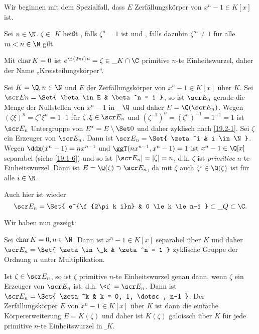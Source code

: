 Wir beginnen mit dem Spezialfall, dass $E$ Zerfällungskörper von $x^n - 1 \in K[x]$ ist.

\begin{df} \label{20.1-1}
	Sei $n \in \N$.
	$\zeta \in \_K$ heißt , falls $\zeta^n = 1$ ist und , falls dazuhin $\zeta^m \neq 1$ für alle $m < n \in \N$ gilt.
	\begin{note}
		Mit $\operatorname{char} K = 0$ ist $e^{\f{2\pi i}n} = \zeta \in \_K \cap \C$ primitive $n$-te Einheitswurzel, daher der Name „Kreisteilungskörper“.
	\end{note}
\end{df}

Sei $K = \Q, n \in \N$ und $E$ der Zerfällungskörper von $x^n - 1 \in K[x]$ über $K$.
Sei $\scr En = \Set{ \beta \in E & \beta^n = 1 }$, so ist $\scr E_n$ gerade die Menge der Nullstellen von $x^n - 1$ in $\_\Q$ und daher $E = \Q(\scr E_n)$.
Wegen $(\zeta \xi)^n = \zeta^n \xi^n = 1 \cdot 1$ für $\zeta, \xi \in \scr E_n$ und $(\zeta^{-1})^n = (\zeta^n)^{-1} = 1^{-1} = 1$ ist $\scr E_n$ Untergruppe von $E^* = E \setminus \Set 0$ und daher zyklisch nach \ref{19.2-1}.
Sei $\zeta$ ein Erzeuger von $\scr E_n$.
Dann ist $\scr E_n = \Set{ \zeta^i & i \in \N }$.
Wegen $\ddx (x^n - 1) = nx^{n-1}$ und $\ggT(nx^{n-1}, x^n - 1) = 1$ ist $x^n - 1 \in \Q[x]$ separabel (siehe \ref{19.1-6}) und so ist $|\scr E_n| = |\zeta| = n$, d.h. $\zeta$ ist \emph{primitive} $n$-te Einheitswurzel.
Dann ist $E = \Q(\zeta) \supset \scr E_n$, da mit $\zeta$ auch $\zeta^i \in \Q(\zeta)$ ist für alle $i \in \N$.
\begin{note}
	Auch hier ist wieder
	\[
		\scr E_n = \Set{ e^{\f{2\pi k i}n} & 0 \le k \le n-1 } \subset \_Q \subset \C.
	\]
\end{note}
Wir haben nun gezeigt:

\begin{st} \label{20.1-2}
	Sei $\Char K = 0, n \in \N$.
	Dann ist $x^n - 1 \in K[x]$ separabel über $K$ und daher $\scr E_n = \Set{ \zeta \in \_k & \zeta^n = 1 }$ zyklische Gruppe der Ordnung $n$ unter Multiplikation.

	Ist $\zeta \in \scr E_n$, so ist $\zeta$ primitive $n$-te Einheitswurzel genau dann, wenn $\zeta$ ein Erzeuger von $\scr E_n$ ist, d.h. $\<\zeta\> = \scr E_n$.
	Dann ist $\scr E_n = \Set{ \zeta^k & k = 0, 1, \dotsc, n-1 }$.
	Der Zerfällungskörper $E$ von $x^n - 1 \in K[x]$ über $K$ ist dann die einfache Körpererweiterung $E = K(\zeta)$ und daher ist $K(\zeta)$ galoissch über $K$ für jede primitive $n$-te Einheitswurzel in $\_K$.
\end{st}

